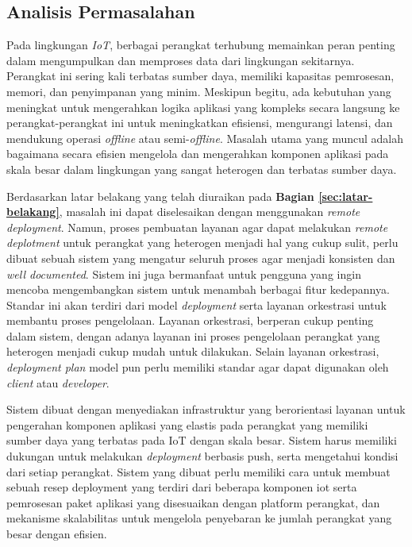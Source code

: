 \subsection{Analisis Permasalahan}
\label{sec:analisis-permasalahan}

Pada lingkungan \textit{IoT}, berbagai perangkat terhubung memainkan peran penting dalam mengumpulkan dan memproses data dari lingkungan sekitarnya. Perangkat ini sering kali terbatas sumber daya, memiliki kapasitas pemrosesan, memori, dan penyimpanan yang minim. Meskipun begitu, ada kebutuhan yang meningkat untuk mengerahkan logika aplikasi yang kompleks secara langsung ke perangkat-perangkat ini untuk meningkatkan efisiensi, mengurangi latensi, dan mendukung operasi \textit{offline} atau semi-\textit{offline}. Masalah utama yang muncul adalah bagaimana secara efisien mengelola dan mengerahkan komponen aplikasi pada skala besar dalam lingkungan yang sangat heterogen dan terbatas sumber daya.

Berdasarkan latar belakang yang telah diuraikan pada \textbf{Bagian \ref{sec:latar-belakang}}, masalah ini dapat diselesaikan dengan menggunakan \textit{remote deployment}. Namun, proses pembuatan layanan agar dapat melakukan \textit{remote deplotment} untuk perangkat yang heterogen menjadi hal yang cukup sulit, perlu dibuat sebuah sistem yang mengatur seluruh proses agar menjadi konsisten dan \textit{well documented}. Sistem ini juga bermanfaat untuk pengguna yang ingin mencoba mengembangkan sistem untuk menambah berbagai fitur kedepannya. Standar ini akan terdiri dari model \textit{deployment} serta layanan orkestrasi untuk membantu proses pengelolaan. Layanan orkestrasi, berperan cukup penting dalam sistem, dengan adanya layanan ini proses pengelolaan perangkat yang heterogen menjadi cukup mudah untuk dilakukan. Selain layanan orkestrasi, \textit{deployment plan} model pun perlu memiliki standar agar dapat digunakan oleh \textit{client} atau \textit{developer}.

Sistem dibuat dengan menyediakan infrastruktur yang berorientasi layanan untuk pengerahan komponen aplikasi yang elastis pada perangkat yang memiliki sumber daya yang terbatas pada IoT dengan skala besar. Sistem harus memiliki dukungan untuk melakukan \textit{deployment} berbasis push, serta mengetahui kondisi dari setiap perangkat. Sistem yang dibuat perlu memiliki cara untuk membuat sebuah resep deployment yang terdiri dari beberapa komponen iot serta
pemrosesan paket aplikasi yang disesuaikan dengan platform perangkat, dan mekanisme skalabilitas untuk mengelola penyebaran ke jumlah perangkat yang besar dengan efisien.

